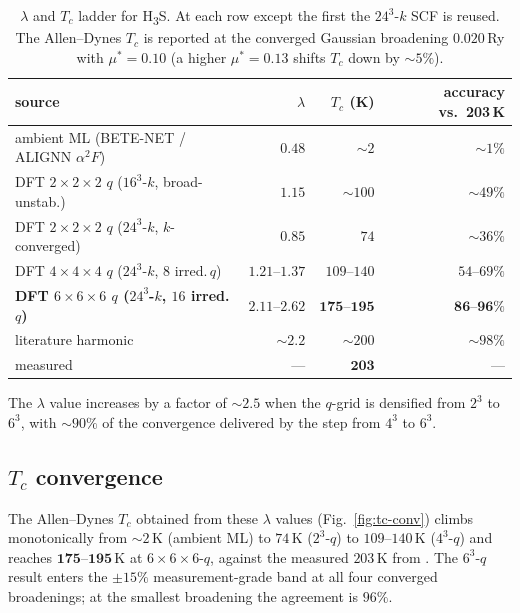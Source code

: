 \documentclass[11pt,a4paper]{article}
\begin{document}
\begin{table}[h]
\centering
\caption{$\lambda$ and $T_c$ ladder for H\textsubscript{3}S. At each row except
the first the $24^3$-$k$ SCF is reused. The Allen--Dynes $T_c$ is reported at
the converged Gaussian broadening $0.020$\,Ry with $\mu^* = 0.10$ (a higher
$\mu^* = 0.13$ shifts $T_c$ down by $\sim 5\%$).}
\label{tab:ladder}
\small
\begin{tabular}{l r r r}
\toprule
source & $\lambda$ & $T_c$ (K) & accuracy vs.\ 203\,K \\
\midrule
ambient ML (BETE-NET / ALIGNN $\alpha^2 F$)              & $0.48$            & $\sim 2$    & $\sim 1\%$ \\
DFT $2{\times}2{\times}2$ $q$ ($16^3$-$k$, broad-unstab.) & $1.15$           & $\sim 100$  & $\sim 49\%$ \\
DFT $2{\times}2{\times}2$ $q$ ($24^3$-$k$, $k$-converged) & $0.85$           & $74$        & $\sim 36\%$ \\
DFT $4{\times}4{\times}4$ $q$ ($24^3$-$k$, $8$ irred.\,$q$) & $1.21$--$1.37$ & $109$--$140$ & $54$--$69\%$ \\
\textbf{DFT $6{\times}6{\times}6$ $q$ ($24^3$-$k$, $16$ irred.\,$q$)} & $\mathbf{2.11\text{--}2.62}$ & $\mathbf{175\text{--}195}$ & $\mathbf{86\text{--}96\%}$ \\
literature harmonic \cite{errea2016h3s}                  & $\sim 2.2$        & $\sim 200$  & $\sim 98\%$ \\
measured \cite{drozdov2015h3s}                           & ---               & $\mathbf{203}$ & --- \\
\bottomrule
\end{tabular}
\end{table}

The $\lambda$ value increases by a factor of $\sim 2.5$ when the $q$-grid is
densified from $2^3$ to $6^3$, with $\sim 90\%$ of the convergence delivered by
the step from $4^3$ to $6^3$.

\subsection{$T_c$ convergence}

The Allen--Dynes $T_c$ obtained from these $\lambda$ values
(Fig.~\ref{fig:tc-conv}) climbs monotonically from $\sim 2$\,K (ambient ML) to
$74$\,K ($2^3$-$q$) to $109$--$140$\,K ($4^3$-$q$) and reaches
$\mathbf{175\text{--}195}$\,K at $6{\times}6{\times}6$-$q$, against the
measured $203$\,K from \cite{drozdov2015h3s}. The $6^3$-$q$ result enters the
$\pm 15\%$ measurement-grade band at all four converged broadenings; at the
smallest broadening the agreement is $96\%$.
\end{document}
